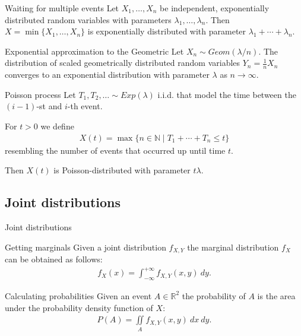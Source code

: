 \documentclass{beamer}
\def\padding{\vspace{0.5cm}}
\begin{document}
\begin{frame}
    \begin{block}{Waiting for multiple events}
        Let $X_1, \dots, X_n$ be independent, exponentially distributed random variables with parameters $\lambda_1, \dots, \lambda_n$. Then $X = \min \{X_1, \dots, X_n\}$ is exponentially distributed with parameter $\lambda_1 + \cdots + \lambda_n$.
    \end{block}\pause\par\padding
    \begin{block}{Exponential approximation to the Geometric}
        Let $X_n \sim Geom(\lambda / n)$. The distribution of scaled geometrically distributed random variables $Y_n = \frac{1}{n} X_n$ converges to an exponential distribution with parameter $\lambda$ as $n \to \infty$.
    \end{block}
\end{frame}

\begin{frame}
    \begin{block}{Poisson process}
        Let $T_1, T_2, \ldots \sim Exp(\lambda)$ i.i.d. that model the time between the $(i - 1)$-st and $i$-th event.\pause\par
        For $t > 0$ we define
        \begin{align*}
            X(t) = \max \{n \in \mathbb{N} \mid T_1 + \cdots + T_n \leq t\}
        \end{align*}
        resembling the number of events that occurred up until time $t$.\pause\par
        Then $X(t)$ is Poisson-distributed with parameter $t \lambda$.
    \end{block}
\end{frame}

\subsection{Joint distributions}
\begin{frame}{Joint distributions}
    \begin{block}{Getting marginals}
        Given a joint distribution $f_{X,Y}$ the marginal distribution $f_X$ can be obtained as follows:
        \begin{align*}
            f_X(x) = \int_{- \infty}^{+ \infty} f_{X,Y}(x,y)\ dy.
        \end{align*}
    \end{block}\pause\par\padding
    \begin{block}{Calculating probabilities}
        Given an event $A \in \mathbb{R}^2$ the probability of $A$ is the area under the probability density function of $X$:
        \begin{align*}
            P(A) = \iint\limits_{A} f_{X,Y}(x,y)\ dx\ dy.
        \end{align*}
    \end{block}
\end{frame}
\end{document}
